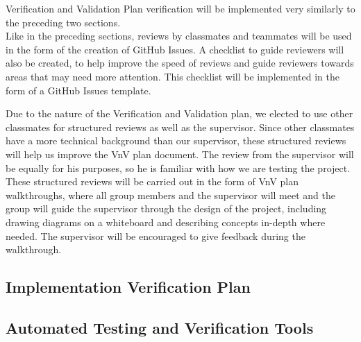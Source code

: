 \documentclass[12pt, titlepage]{article}
\begin{document}
Verification and Validation Plan verification will be implemented very similarly to the preceding two sections. \\
Like in the preceding sections, reviews by classmates and teammates will be used in the form of the creation of GitHub Issues. A checklist to guide reviewers will also be created, to help improve the speed of reviews and guide reviewers towards areas that may need more attention. This checklist will be implemented in the form of a GitHub Issues template.

Due to the nature of the Verification and Validation plan, we elected to use other classmates for structured reviews as well as the supervisor. Since other classmates have a more technical background than our supervisor, these structured reviews will help us improve the VnV plan document. The review from the supervisor will be equally for his purposes, so he is familiar with how we are testing the project. These structured reviews will be carried out in the form of VnV plan walkthroughs, where all group members and the supervisor will meet and the group will guide the supervisor through the design of the project, including drawing diagrams on a whiteboard and describing concepts in-depth where needed. The supervisor will be encouraged to give feedback during the walkthrough.

\subsection{Implementation Verification Plan}



\subsection{Automated Testing and Verification Tools}
\end{document}
